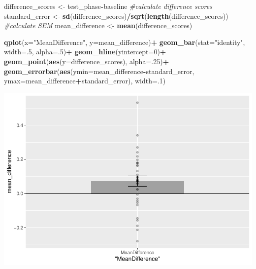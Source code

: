 \documentclass[
]{book}
\newenvironment{Shaded}{\begin{snugshade}}{\end{snugshade}}
\newcommand{\AttributeTok}[1]{\textcolor[rgb]{0.13,0.29,0.53}{#1}}
\newcommand{\CommentTok}[1]{\textcolor[rgb]{0.56,0.35,0.01}{\textit{#1}}}
\newcommand{\DecValTok}[1]{\textcolor[rgb]{0.00,0.00,0.81}{#1}}
\newcommand{\FunctionTok}[1]{\textcolor[rgb]{0.13,0.29,0.53}{\textbf{#1}}}
\newcommand{\NormalTok}[1]{#1}
\newcommand{\OtherTok}[1]{\textcolor[rgb]{0.56,0.35,0.01}{#1}}
\newcommand{\SpecialCharTok}[1]{\textcolor[rgb]{0.81,0.36,0.00}{\textbf{#1}}}
\newcommand{\StringTok}[1]{\textcolor[rgb]{0.31,0.60,0.02}{#1}}
\begin{document}
\begin{Shaded}
\begin{Highlighting}[]
\NormalTok{difference\_scores }\OtherTok{\textless{}{-}}\NormalTok{ test\_phase}\SpecialCharTok{{-}}\NormalTok{baseline }\CommentTok{\#calculate difference scores}
\NormalTok{standard\_error }\OtherTok{\textless{}{-}} \FunctionTok{sd}\NormalTok{(difference\_scores)}\SpecialCharTok{/}\FunctionTok{sqrt}\NormalTok{(}\FunctionTok{length}\NormalTok{(difference\_scores)) }\CommentTok{\#calculate SEM}
\NormalTok{mean\_difference }\OtherTok{\textless{}{-}} \FunctionTok{mean}\NormalTok{(difference\_scores)}

\FunctionTok{qplot}\NormalTok{(}\AttributeTok{x=}\StringTok{"MeanDifference"}\NormalTok{, }\AttributeTok{y=}\NormalTok{mean\_difference)}\SpecialCharTok{+}
  \FunctionTok{geom\_bar}\NormalTok{(}\AttributeTok{stat=}\StringTok{"identity"}\NormalTok{, }\AttributeTok{width=}\NormalTok{.}\DecValTok{5}\NormalTok{, }\AttributeTok{alpha=}\NormalTok{.}\DecValTok{5}\NormalTok{)}\SpecialCharTok{+}
  \FunctionTok{geom\_hline}\NormalTok{(}\AttributeTok{yintercept=}\DecValTok{0}\NormalTok{)}\SpecialCharTok{+}
  \FunctionTok{geom\_point}\NormalTok{(}\FunctionTok{aes}\NormalTok{(}\AttributeTok{y=}\NormalTok{difference\_scores), }\AttributeTok{alpha=}\NormalTok{.}\DecValTok{25}\NormalTok{)}\SpecialCharTok{+}
  \FunctionTok{geom\_errorbar}\NormalTok{(}\FunctionTok{aes}\NormalTok{(}\AttributeTok{ymin=}\NormalTok{mean\_difference}\SpecialCharTok{{-}}\NormalTok{standard\_error, }
                                  \AttributeTok{ymax=}\NormalTok{mean\_difference}\SpecialCharTok{+}\NormalTok{standard\_error), }\AttributeTok{width=}\NormalTok{.}\DecValTok{1}\NormalTok{)}
\end{Highlighting}
\end{Shaded}

\includegraphics{Statistics_Lab_files/figure-latex/unnamed-chunk-180-1.pdf}
\end{document}
